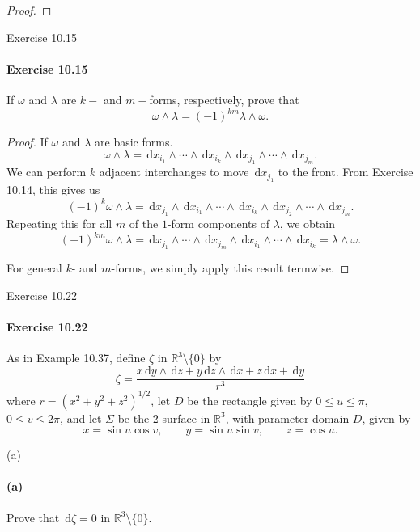 \documentclass[12pt]{article}
\newenvironment{fullbox}{\begin{lrbox}{\savefullbox}\begin{minipage}{\dimexpr\textwidth-2\fboxsep\relax}}{\end{minipage}\end{lrbox}\begin{center}\framebox[\textwidth]{\usebox{\savefullbox}}\end{center}}
\newenvironment{pbox}[1][]{\begin{fullbox}\ifx#1\empty\else\paragraph{#1}\fi}{\end{fullbox}}
\newcommand{\R}{\mathbb{R}}
\newcommand{\<}{\langle}
\renewcommand{\>}{\rangle}
\newcommand{\dd}[1]{\,\mathrm{d}#1}
\begin{document}
\begin{proof}
\end{proof}


\newpage
\begin{pbox}[Exercise 10.15]
    If $\omega$ and $\lambda$ are $k-$ and $m-$forms, respectively, prove that
    \[
        \omega \wedge \lambda = (-1)^{km} \lambda \wedge \omega.
    \]
\end{pbox}

\begin{proof}
    If $\omega$ and $\lambda$ are basic forms.
    \[
        \omega \wedge \lambda
            = \dd{x_{i_1}} \wedge \cdots \wedge \dd{x_{i_k}} \wedge \dd{x_{j_1}} \wedge \cdots \wedge \dd{x_{j_m}}.
    \]
    We can perform $k$ adjacent interchanges to move $\dd{x_{j_1}}$ to the front. From Exercise 10.14, this gives us
    \[
        (-1)^k\omega \wedge \lambda
            = \dd{x_{j_1}} \wedge \dd{x_{i_1}} \wedge \cdots \wedge \dd{x_{i_k}} \wedge \dd{x_{j_2}} \wedge \cdots \wedge \dd{x_{j_m}}.
    \]
    Repeating this for all $m$ of the $1$-form components of $\lambda$, we obtain
    \[
        (-1)^{km}\omega \wedge \lambda
            = \dd{x_{j_1}} \wedge \cdots \wedge \dd{x_{j_m}} \wedge \dd{x_{i_1}} \wedge \cdots \wedge \dd{x_{i_k}}
            = \lambda \wedge \omega.
    \]

    For general $k$- and $m$-forms, we simply apply this result termwise.

\end{proof}


\newpage
\begin{pbox}[Exercise 10.22]
    As in Example 10.37, define $\zeta$ in $\R^3\setminus \{0\}$ by
    \[\zeta = \frac{x\dd{y} \wedge \dd{z} + y\dd{z}\wedge \dd{x} + z\dd{x} + \dd{y}}{r^3}\]
    where $r=(x^2+y^2+z^2)^{1/2}$, let $D$ be the rectangle given by $0\leq u \leq \pi$, $0\leq v\leq 2\pi$, and let $\Sigma$ be the 2-surface in $\R^3$, with parameter domain $D$, given by
    \[x=\sin{u}\cos{v}, \qquad y=\sin{u}\sin{v}, \qquad z=\cos{u}.\]
\end{pbox}

\begin{pbox}[(a)]
    Prove that $\dd{\zeta} = 0$ in $\R^3\setminus \{0\}$.
\end{pbox}
\end{document}
